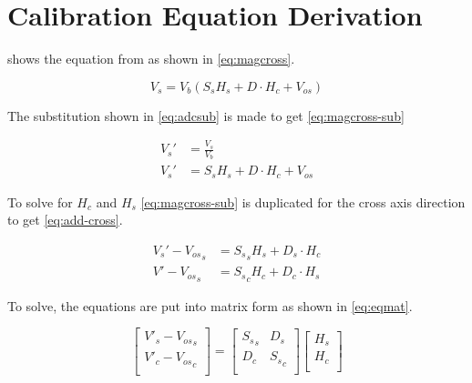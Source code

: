 
\chapter{Calibration Equation Derivation}

\label{ch:mag-deriv}

 shows the equation from \cite{AN215} as shown in \cref{eq:magcross}.

\begin{equation}
    V_s = V_b \left(S_s H_s + D \cdot H_c + V_{os} \right)
    \label{eq:magcross2}
\end{equation}

The substitution shown in \cref{eq:adcsub} is made to get \cref{eq:magcross-sub}

\begin{align}
    V_s' & =\frac{V_s}{V_b}\\
    V_s' & = S_s H_s + D \cdot H_c + V_{os}
    \label{eq:magcross-sub}
\end{align}

To solve for $H_c$ and $H_s$ \cref{eq:magcross-sub} is duplicated for the cross axis direction to get \cref{eq:add-cross}.

\begin{equation}
    \begin{aligned}
        V_s' - {V_{os}}_s &=  {S_s}_s H_s  + D_s \cdot H_c\\
        V' - {V_{os}}_s &=  {S_s}_c H_c  + D_c \cdot H_s
    \end{aligned}
    \label{eq:add-cross}
\end{equation}

To solve, the equations are put into matrix form as shown in \cref{eq:eqmat}.

\begin{equation}
    \begin{bmatrix}
        V'_s - {V_{os}}_s\\
        V'_c - {V_{os}}_c\\
    \end{bmatrix} =
    \begin{bmatrix}
        {S_s}_s & D_s \\
        D_c & {S_s}_c \\
    \end{bmatrix}
    \begin{bmatrix}
        H_s\\
        H_c\\
    \end{bmatrix}
    \label{eq:eqmat}
\end{equation}

